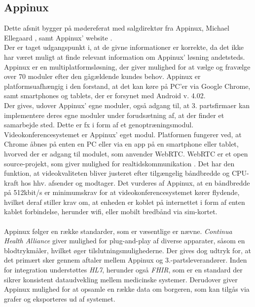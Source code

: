 \subsection{Appinux}
Dette afsnit bygger på mødereferat med salgdirektør fra Appinux, Michael Ellegaard \parencite{moedeappinux}, samt Appinux' website \cite{appinuxwebsite}.\\Der er taget udgangspunkt i, at de givne informationer er korrekte, da det ikke har været muligt at finde relevant information om Appinux' løsning andetsteds.\\
Appinux er en multiplatformsløsning, der giver mulighed for at vælge og fravælge over 70 moduler efter den gågældende kundes behov. Appinux er platformsuafhængig i den forstand, at det kan køre på PC'er via Google Chrome, samt  smartphones og tablets, der er forsynet med Android v. 4.02.\\Der gives, udover Appinux' egne moduler, også adgang til, at 3. partsfirmaer kan implementere deres egne moduler under forudsætning af, at der finder et samarbejde sted. Dette er fx i form af et genoptræningsmodul.\\Videokonferencesystemet er Appinux' eget modul. Platformen fungerer ved, at Chrome åbnes på enten en PC eller via en app på en smartphone eller tablet, hvorved der er adgang til modulet, som anvender WebRTC. WebRTC er et open source-projekt, som giver mulighed for realtidskommunikation \cite{webrtchjemmeside}. Det har den funktion, at videokvaliteten bliver justeret efter tilgængelig båndbredde og CPU-kraft hos hhv. afsender og modtager. Det vurderes af Appinux, at en båndbredde på 512kbit/s er minimumskrav for at videokonferencesystemet kører flydende, hvilket deraf stiller krav om, at enheden er koblet på internettet i form af enten kablet forbindelse, herunder wifi, eller mobilt bredbånd via sim-kortet.
\\ \\
Appinux følger en række standarder, som er væsentlige   er nævne. \textit{Continua Health Alliance} giver mulighed for plug-and-play af diverse apparater, såsom en blodtrykmåler, hvilket øger tilslutningsmulighederne. Der gives dog udtryk for, at det primært sker gennem aftaler mellem Appinux og 3.-partsleverandører. Inden for integration understøttes \textit{HL7}, herunder også \textit{FHIR}, som er en standard der sikrer konsistent dataudvekling mellem medicinske systemer. Derudover giver Appinux mulighed for at opsamle en række data om borgeren, som kan tilgås via grafer og eksporteres ud af systemet.


